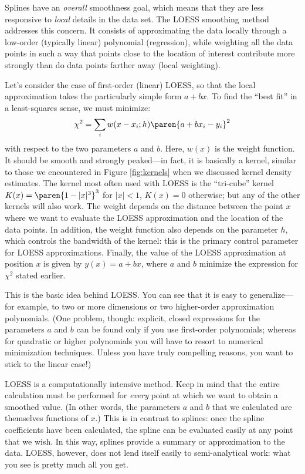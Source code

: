 Splines have an \emph{overall} smoothness goal, which means that they
are less responsive to \emph{local} details in the data set. The LOESS
smoothing method addresses this concern. It consists of approximating
the data locally through a low-order (typically linear) polynomial  
(regression),  while weighting all the data points in such a way that
points close to the location of interest contribute more strongly than
do data points farther away (local weighting).

Let's consider the case of first-order (linear) LOESS, so that the local
approximation takes the particularly simple form $a + bx$. To find the
``best fit'' in a least-squares sense, we must minimize:
%
\[
\chi^2 = \sum_i w( x-x_i; h ) \paren{ a + b x_i - y_i }^2
\]
%
with respect to the two parameters $a$ and $b$. Here, $w(x)$ is the
weight function. It should be smooth and strongly peaked---in fact, it
is basically a kernel, similar to those we encountered in Figure
\ref{fig:kernels} when we discussed kernel density estimates.  The
kernel most often used with LOESS is the ``tri-cube'' kernel $K(x) =
\paren{ 1-|x|^3 }^3$ for $|x|<1$, $K(x)=0$ otherwise; but any of the
other kernels will also work.  The weight depends on the distance
between the point $x$ where we want to evaluate the LOESS
approximation and the location of the data points. In addition, the
weight function also depends on the parameter $h$, which controls the
bandwidth of the kernel: this is the primary control parameter for
LOESS approximations.  Finally, the value of the LOESS approximation
at position $x$ is given by $y(x) = a + b x$, where $a$ and $b$
minimize the expression for $\chi^2$ stated earlier.

This is the basic idea behind LOESS. You can see that it is easy to
generalize---for example, to two or more dimensions or two higher-order
approximation polynomials. (One problem, though: explicit, closed
expressions for the parameters $a$ and $b$ can be found only if you
use first-order polynomials; whereas for quadratic or higher
polynomials you will have to resort to numerical minimization
techniques. Unless you have truly compelling reasons, you want to
stick to the linear case!)

LOESS is a computationally intensive method. Keep in mind that the
entire calculation must be performed for \emph{every} point at which
we want to obtain a smoothed value. (In other words, the parameters
$a$ and $b$ that we calculated are themselves functions of $x$.) This
is in contrast to splines: once the spline coefficients have been
calculated, the spline can be evaluated easily at any point that we
wish. In this way, splines provide a summary or approximation to the
data. LOESS, however, does not lend itself easily to semi-analytical
work: what you see is pretty much all you get.

